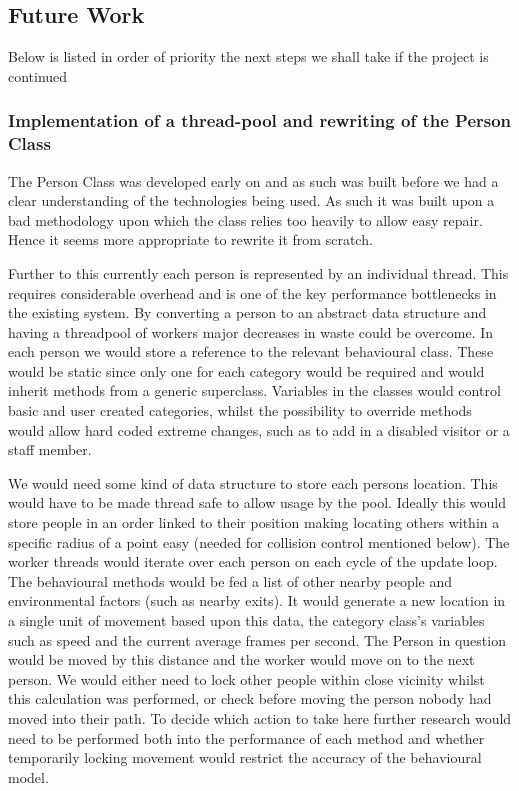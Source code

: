 \subsection{Future Work}

Below is listed in order of priority the next steps we shall take
if the project is continued


\subsubsection{Implementation of a thread-pool and rewriting of the Person Class}
\label{threadingSolution}

The Person Class was developed early on and as such was built before
we had a clear understanding of the technologies being used. As such
it was built upon a bad methodology upon which the class relies too
heavily to allow easy repair. Hence it seems more appropriate to rewrite
it from scratch.

Further to this currently each person is represented by an individual
thread. This requires considerable overhead and is one of the key
performance bottlenecks in the existing system. By converting a person
to an abstract data structure and having a threadpool of workers major
decreases in waste could be overcome. In each person we would store
a reference to the relevant behavioural class. These would be static
since only one for each category would be required and would inherit
methods from a generic superclass. Variables in the classes would
control basic and user created categories, whilst the possibility
to override methods would allow hard coded extreme changes, such as
to add in a disabled visitor or a staff member.

We would need some kind of data structure to store each persons location.
This would have to be made thread safe to allow usage by the pool.
Ideally this would store people in an order linked to their position
making locating others within a specific radius of a point easy (needed
for collision control mentioned below). The worker threads would iterate
over each person on each cycle of the update loop. The behavioural
methods would be fed a list of other nearby people and environmental
factors (such as nearby exits). It would generate a new location in
a single unit of movement based upon this data, the category class's
variables such as speed and the current average frames per second.
The Person in question would be moved by this distance and the worker
would move on to the next person. We would either need to lock other
people within close vicinity whilst this calculation was performed,
or check before moving the person nobody had moved into their path.
To decide which action to take here further research would need to
be performed both into the performance of each method and whether
temporarily locking movement would restrict the accuracy of the behavioural
model.


